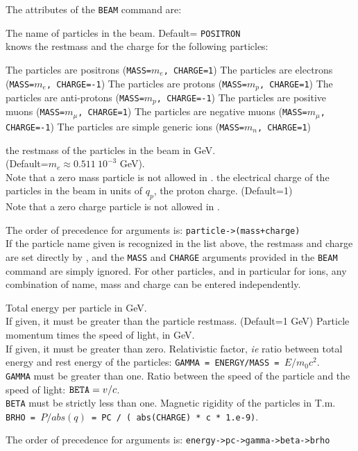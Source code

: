 The attributes of the {\tt BEAM} command are: 
\begin{madlist}
   The name of particles in the beam. Default= {\tt POSITRON}\\
  \mad knows the restmass and the charge for the following particles:
  \begin{madlist}
     The particles are positrons ({\tt MASS=$m_e$, CHARGE=1})
     The particles are electrons ({\tt MASS=$m_e$, CHARGE=-1}) 
     The particles are protons ({\tt MASS=$m_p$, CHARGE=1})
     The particles are anti-protons ({\tt MASS=$m_p$, 
    CHARGE=-1}) 
     The particles are positive muons ({\tt MASS=$m_{\mu}$, 
    CHARGE=1}) 
     The particles are negative muons ({\tt MASS=$m_{\mu}$, 
    CHARGE=-1}) 
     The particles are simple generic ions ({\tt MASS=$m_n$, 
    CHARGE=1})
  \end{madlist}
   the restmass of the particles in the beam in GeV. \\
  (Default=$m_e \approx 0.511\ 10^{-3}$ GeV).\\
  Note that a zero mass particle is not allowed in \mad.
  \label{beam_charge} the electrical charge of the
  particles in the beam in units of $q_p$, the proton charge. (Default=1) \\
  Note that a zero charge particle is not allowed in \mad.
\end{madlist} 
The order of precedence for arguments is:  {\tt particle->(mass+charge)}\\ 
If the particle name given is recognized in the list above, the restmass
and charge are set directly by \madx, and the {\tt MASS} and {\tt CHARGE} 
arguments provided in the {\tt BEAM} command are
simply ignored. For other particles, and in particular for ions, any
combination of name, mass and charge can be entered independently.
\\

\begin{madlist}
   \label{beam_energy} Total energy per particle in
  GeV.\\ If given, it must be greater than the particle
  restmass. (Default=1 GeV)
   Particle momentum times the speed of light, in GeV. \\
  If given, it must be greater than zero. 
   Relativistic factor, {\sl ie} ratio between total
  energy and rest energy of the particles: {\tt GAMMA = ENERGY/MASS = $E / m_0 
  c^2$}. 
  \\ {\tt GAMMA} must be greater than one. 
   Ratio between the speed of the particle
  and the speed of light: ${\tt BETA} = v / c$.\\
  {\tt BETA} must be strictly less than one.
   Magnetic rigidity of the particles in T.m. \\ 
  {\tt BRHO = $P / abs(q)$ = PC / ( abs(CHARGE) * c * 1.e-9)}. 
\end{madlist}  
The order of precedence for arguments is: {\tt energy->pc->gamma->beta->brho}

